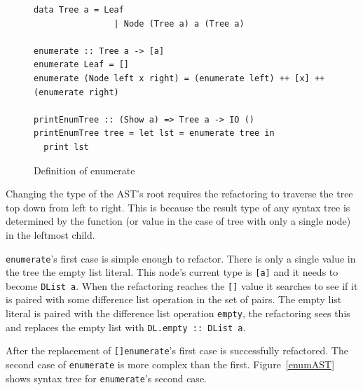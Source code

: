 \begin{figure}[t]
\DIFdelbeginFL %


\DIFdelendFL \DIFaddbeginFL \begin{lstlisting}
data Tree a = Leaf
                | Node (Tree a) a (Tree a)

enumerate :: Tree a -> [a]
enumerate Leaf = []
enumerate (Node left x right) = (enumerate left) ++ [x] ++ (enumerate right)

printEnumTree :: (Show a) => Tree a -> IO ()
printEnumTree tree = let lst = enumerate tree in
  print lst
\end{lstlisting}
\DIFaddendFL \caption{Definition of enumerate}
\label{enumBefore}
\end{figure} 

Changing the type of the AST's root requires the refactoring to traverse the tree top down from left to right. This is because the result type of any syntax tree is determined by the function (or value in the case of tree with only a single node) in the leftmost child. 

\texttt{enumerate}'s first case is simple enough to refactor. There is only a single value in the tree the empty list literal. This node's current type is \texttt{[a]} and it needs to become \texttt{DList a}. When the refactoring reaches the \texttt{[]} value it searches to see if it is paired with some difference list operation in the set of pairs. The empty list literal is paired with the difference list operation \texttt{empty}, the refactoring sees this and replaces the empty list with \texttt{DL.empty :: DList a}.

After the replacement of \texttt{[]}\DIFaddbegin \DIFadd{, }\DIFaddend \texttt{enumerate}'s first case is successfully refactored. The second case of \texttt{enumerate} is more complex than the first. Figure~\ref{enumAST} shows \DIFdelbegin {}\DIFdelend \DIFaddbegin {}\DIFaddend syntax tree for \texttt{enumerate}'s second case. 

